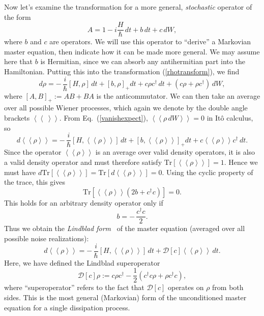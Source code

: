 \documentclass[aps,twocolumn,superscriptaddress,footinbib,floatfix,showpacs]{revtex4}
\newcommand{\dlangle}{\left\langle\!\left\langle}
\newcommand{\drangle}{\right\rangle\!\right\rangle}
\def\dexpct#1{\dlangle{#1}\drangle}
\begin{document}
Now let's examine the transformation for a more general, \textit{stochastic}
operator of the form
\begin{equation}
  A = 1-i\frac{H}{\hbar}\,dt + b\,dt + c\, dW,
\end{equation}
where $b$ and $c$ are operators.
We will use this operator to ``derive'' a Markovian master equation, then 
indicate how it can be made more general.
We may assume here that $b$ is Hermitian, since we can absorb any antihermitian
part into the Hamiltonian.
Putting this into the transformation (\ref{rhotransform}), we find
\begin{equation}
  d\rho = -\,\frac{i}{\hbar}[H,\rho]\,dt + [b, \rho]_+dt + c\rho c^\dagger\,dt
   + \left(c\rho+\rho c^\dagger\right)\, dW,
  \label{masteqbc}
\end{equation}
where $[A,B]_+:=AB+BA$ is the anticommutator.
We can then take an average over all possible Wiener processes, which
again we denote by the double angle brackets 
$\dexpct{~}$.  From Eq.~(\ref{vanishexpect}), $\dexpct{\rho\,dW}=0$ in It\^o calculus, so
\begin{equation}
  d\dexpct{\rho} = -\,\frac{i}{\hbar}\left[H,\dexpct{\rho}\right]\,dt
     + \left[b,\dexpct{\rho}\right]_+dt + c\dexpct{\rho}\!c^\dagger\,dt.
\end{equation}
Since the operator $\dexpct{\rho}$ is an average over valid density
operators, it is also a valid density operator and must therefore
satisfy $\mathrm{Tr}[\dexpct{\rho}]=1$.  Hence we must have
$d\mathrm{Tr}[\dexpct{\rho}]= \mathrm{Tr}[d\!\dexpct{\rho}]=0$.  Using
the cyclic property of the trace, this gives
\begin{equation}
  \mathrm{Tr}\left[\dexpct{\rho}\left(2b+c^\dagger c\right)\right]=0.
\end{equation}
This holds for an arbitrary density operator only if
\begin{equation}
  b=-\,\frac{c^\dagger c}{2}.
\end{equation}
Thus we obtain the \textit{Lindblad form}~\cite{Lindblad76} of the
master equation (averaged over all possible noise realizations):
\begin{equation}
  d\dexpct{\rho} = -\,\frac{i}{\hbar}\left[H,\dexpct{\rho}\right]\,dt
     + \mathcal{D}[c]\!\dexpct{\rho}\,dt.
\end{equation}
Here, we have defined the Lindblad superoperator
\begin{equation}
  \mathcal{D}[c]\rho := c\rho c^\dagger - \frac{1}{2}\left(c^\dagger c\rho + \rho c^\dagger c\right),
  \label{lindbladsuperop}
\end{equation}
where ``superoperator'' refers to the fact that $\mathcal{D}[c]$ operates 
on $\rho$ from both sides.
This is the most general (Markovian) form of the unconditioned 
master equation for a single dissipation process.
\end{document}
